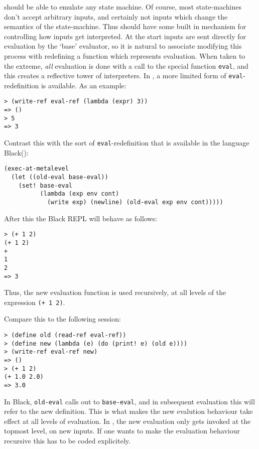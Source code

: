\rad{} should be able to emulate any state machine. Of course, most state-machines
don't accept arbitrary inputs, and certainly not inputs which change the
semantics of the state-machine. Thus \rad{} should have some built in mechanism
for controlling how inputs get interpreted. At the start inputs are sent
directly for evaluation by the `base' evaluator, so it is natural to associate
modifying this process with redefining a function which represents evaluation.
When taken to the extreme, \emph{all} evaluation is done with a call to the
special function \texttt{eval}, and this creates a reflective tower of
interpreters. In \rad{}, a more limited form of \texttt{eval}-redefinition is
available. As an example:
\bigskip
\begin{Verbatim}
> (write-ref eval-ref (lambda (expr) 3))
=> ()
> 5
=> 3
\end{Verbatim}
Contrast this with the sort of \texttt{eval}-redefinition that is available in
the language Black(\cite{Asai1997}):
\begin{lstlisting}
(exec-at-metalevel
  (let ((old-eval base-eval))
    (set! base-eval
          (lambda (exp env cont)
            (write exp) (newline) (old-eval exp env cont)))))
\end{lstlisting}
After this the Black REPL will behave as follows:
\bigskip
\begin{Verbatim}
> (+ 1 2)
(+ 1 2)
+
1
2
=> 3
\end{Verbatim}
Thus, the new evaluation function is used recursively, at all levels of the
expression \texttt{(+ 1 2)}.

Compare this to the following \rad{} session:
\bigskip
\begin{Verbatim}
> (define old (read-ref eval-ref))
> (define new (lambda (e) (do (print! e) (old e))))
> (write-ref eval-ref new)
=> ()
> (+ 1 2)
(+ 1.0 2.0)
=> 3.0
\end{Verbatim}
In Black, \texttt{old-eval} calls out to
\texttt{base-eval}, and in subsequent evaluation this will refer to the new
definition. This is what makes the new evalution behaviour take effect at all
levels of evaluation. In \rad{}, the new evaluation only gets invoked at the
topmost level, on new inputs. If one wants to make the evaluation behaviour
recursive this has to be coded explicitely.

